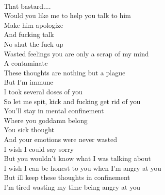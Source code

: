 \documentclass[12pt, b5paper]{article}
\begin{document}
\\That bastard....
\\Would you like me to help you talk to him
\\Make him apologize
\\And fucking talk
\\No shut the fuck up
\\Wasted feelings you are only a scrap of my mind
\\A contaminate
\\These thoughts are nothing but a plague
\\But I'm immune
\\I took several doses of you
\\So let me spit, kick and fucking get rid of you
\\You'll stay in mental confinement
\\Where you goddamn belong
\\You sick thought
\\And your emotions were never wasted
\\I wish I could say sorry
\\But you wouldn't know what I was talking about
\\I wish I can be honest to you when I'm angry at you
\\But ill keep these thoughts in confinement
\\I'm tired wasting my time being angry at you

\newpage
\end{document}
